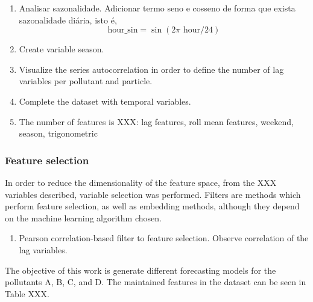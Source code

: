 \begin{enumerate}
    \item Analisar sazonalidade. Adicionar termo seno e cosseno de forma que
    exista sazonalidade diária, isto é, 
    $$
    \text{hour\_sin} = \sin(2\pi \text{ hour}/24)
    $$
    \item Create variable season. 
    \item Visualize the series autocorrelation in order to define the number
    of lag variables per pollutant and particle.
    \item Complete the dataset with temporal variables.     
    \item The number of features is XXX: lag features, roll mean features,
    weekend, season, trigonometric  
\end{enumerate}

\subsubsection{Feature selection}

In order to reduce the dimensionality of the feature space, from the XXX
variables described, variable selection was performed. Filters are methods
which perform feature selection, as well as embedding methods, although they
depend on the machine learning algorithm chosen. 

\begin{enumerate}
    \item Pearson correlation-based filter to feature selection. Observe
    correlation of the lag variables. 
\end{enumerate}

The objective of this work is generate different forecasting models for the
pollutants A, B, C, and D. The maintained features in the dataset can be seen
in Table XXX.


